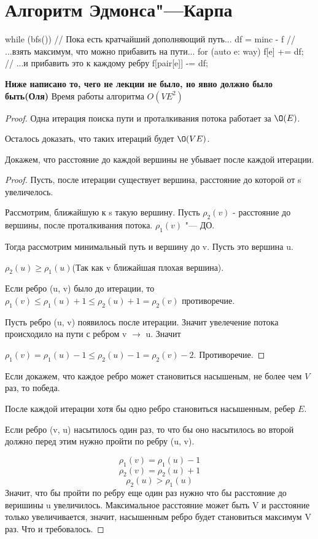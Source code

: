 \section{Алгоритм Эдмонса"---Карпа}

\begin{cppcode}
while (bfs()) {           // Пока есть кратчайший дополняющий путь...
	df = min{c - f}       // ...взять максимум, что можно прибавить на пути...
	for (auto e: way) {
		f[e] += df;       // ...и прибавить это к каждому ребру
		f[pair[e]] -= df;
	}
}
\end{cppcode}

\textbf{\Large Ниже написано то, чего не лекции не было, но явно должно было быть(Оля)}
Время работы алгоритма $O(VE^2)$
\begin{proof}
Одна итерация поиска пути и проталкивания потока работает за $\O(E)$.

Осталось доказать, что таких итераций будет $\O(VE)$.

Докажем, что расстояние до каждой вершины не убывает после каждой итерации. 
\begin{proof}
    Пусть, после итерации существует вершина, расстояние до которой от s увеличелось. 

    Рассмотрим, ближайшую к s такую вершину. Пусть $\rho_2(v)$ - расстояние до вершины, после
    проталкивания потока. $\rho_1(v)$ "--- ДО.

    Тогда рассмотрим минимальный путь и вершину до v. Пусть это вершина u.

    $\rho_2(u) \ge \rho_1(u)$(Так как v ближайшая плохая вершина).

    Если ребро (u, v) было до итерации, то $\rho_1(v) \le \rho_1(u) + 1 \le \rho_2(u) + 1 = \rho_2(v)$  противоречие.

    Пусть ребро (u, v) появилось после итерации. Значит увелечение потока происходило на пути 
    с ребром v $\to$ u. Значит
    
    $\rho_1(v) = \rho_1(u) - 1 \le \rho_2(u) - 1 = \rho_2(v) - 2$. Противоречие.
\end{proof}

    Если докажем, что каждое ребро может становиться насышеным, не более чем $V$ раз, то
    победа.
    
    После каждой итерации хотя бы одно ребро становиться насышенным, ребер $E$.

    Если ребро (v, u) насытилось один раз, то что бы оно насытилось во второй должно 
    перед этим нужно пройти по ребру (u, v).

    $$\rho_1(v) = \rho_1(u) - 1$$
    $$\rho_2(v) = \rho_2(u) + 1$$
    $$\rho_2(u) > \rho_1(u)$$
    Значит, что бы пройти по ребру еще один раз нужно что бы расстояние до веришины u увеличилось. 
    Максимальное расстояние может быть V и расстояние только увеличивается, значит, насышенным
    ребро будет становиться максимум V раз. Что и требовалось.  
\end{proof}

